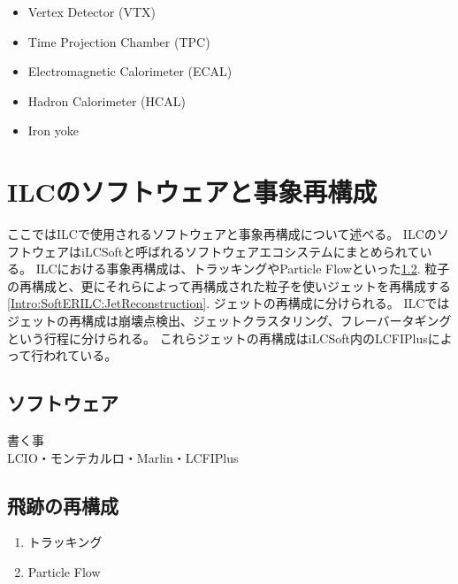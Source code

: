 \begin{itemize}
  \item Vertex Detector (VTX)
  \item Time Projection Chamber (TPC)
  \item Electromagnetic Calorimeter (ECAL)
  \item Hadron Calorimeter (HCAL)
  \item Iron yoke
\end{itemize}

\section{ILCのソフトウェアと事象再構成} \label{Intro:SoftwareandEventReconstructionofILC}

ここではILCで使用されるソフトウェアと事象再構成について述べる。
ILCのソフトウェアはiLCSoft\cite{iLCSoft}と呼ばれるソフトウェアエコシステムにまとめられている。
ILCにおける事象再構成は、トラッキングやParticle Flowといった\ref{Intro:SoftERILC:ParticleReconstruction}. 粒子の再構成と、更にそれらによって再構成された粒子を使いジェットを再構成する\ref{Intro:SoftERILC:JetReconstruction}. ジェットの再構成に分けられる。
ILCではジェットの再構成は崩壊点検出、ジェットクラスタリング、フレーバータギングという行程に分けられる。
これらジェットの再構成はiLCSoft内のLCFIPlus\cite{LCFIPlus}によって行われている。

\subsection{ソフトウェア} \label{Intro:SoftERILC:Software}

書く事\\
LCIO・モンテカルロ・Marlin・LCFIPlus\\


\subsection{飛跡の再構成} \label{Intro:SoftERILC:ParticleReconstruction}

\begin{enumerate}
  \item トラッキング
  \item Particle Flow
\end{enumerate}

